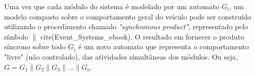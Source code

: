 \documentclass[conference]{IEEEtran}
\begin{document}
\begin{table}[h]
	\centering
	\caption{Função de transição $\delta$.}
	\label{tab:func_transicao}
\end{table}

Uma vez que cada módulo do sistema é modelado por um automato $G_{i}$, um modelo composto sobre o comportamento geral do veículo pode ser construído utilizando o procedimento chamado \textit{"synchronous product"}, representado pelo símbolo $\lVert$ cite(Event\_Systems\_ebook). O resultado em fornecer o produto síncrono sobre todo $G_{i}$ é um novo automato que representa o comportamento "livre" (não controlado), das atividades simultâneas dos módulos. Ou seja, $G = G_{1} \lVert G_{2} \lVert G_{3} \lVert ... \lVert G_{n}$.  
\end{document}
